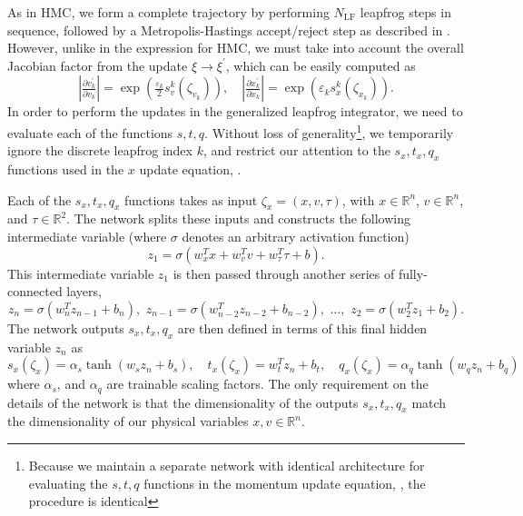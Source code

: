 \documentclass{article} %
\begin{document}
As in HMC, we form a complete trajectory by performing \(N_{\mathrm{LF}}\) leapfrog steps in sequence, followed by a
Metropolis-Hastings accept/reject step as described in .
%
However, unlike in the expression for HMC, we must take into account the overall Jacobian factor from the update
\(\xi\rightarrow\xi^{\prime}\), which can be easily computed as 
%
\begin{equation}
   \left|\tfrac{\partial v^{\prime}_{k}}{\partial v_{k}}\right| 
   = \exp{\left(\tfrac{\varepsilon_{k}}{2}s^{k}_{v}(\zeta_{v_{k}})\right)},\quad
   \left|\tfrac{\partial x^{\prime}_{k}}{\partial x_{k}}\right| 
   = \exp{\left(\varepsilon_{k} s^{k}_{x}(\zeta_{x_{k}})\right)}.
\end{equation}
%
In order to perform the updates in the generalized leapfrog integrator, we need to evaluate each of the functions
\(s, t, q\).
%
%
Without loss of generality\footnote{Because we maintain a separate network with identical architecture for evaluating
the \(s, t, q\) functions in the momentum update equation, , the procedure is identical},
we temporarily ignore the discrete leapfrog index \(k\), and restrict our attention to the
\(s_{x}, t_{x}, q_{x}\) functions used in the \(x\) update equation, .
%

Each of the \(s_{x}, t_{x}, q_{x}\) functions takes as input \(\zeta_{x} = (x, v, \tau)\), with \(x\in\mathbb{R}^{n}\),
\(v\in\mathbb{R}^{n}\), and \(\tau \in \mathbb{R}^{2}\).
%
The network splits these inputs and constructs the following intermediate variable (where \(\sigma\) denotes an
arbitrary activation function)
%
\begin{equation}
   z_{1} = \sigma(w_{x}^{T}x + w_{v}^{T}v + w_{\tau}^{T}\tau + b).
\end{equation}
%
This intermediate variable \(z_{1}\) is then passed through another series of fully-connected layers,
%
\begin{equation}
   z_{n} = \sigma(w_{n}^{T} z_{n-1} + b_{n}),\,\, z_{n-1}=\sigma(w_{n-2}^{T}z_{n-2} + b_{n-2}),\,\,%
   \ldots,\,\, z_{2} = \sigma(w_{2}^{T} z_{1} + b_{2}).
\end{equation}
%
The network outputs \(s_{x}, t_{x}, q_{x}\) are then defined in terms of this final hidden variable \(z_{n}\) as
%
\begin{equation}
   s_{x}(\zeta_{x}) = \alpha_{s}\tanh(w_{s}z_{n} + b_{s}),\quad
   t_{x}(\zeta_{x}) = w_{t}^{T}z_{n} + b_{t},\quad
   q_{x}(\zeta_{x}) = \alpha_{q}\tanh(w_{q}z_{n} + b_{q})
\end{equation}
%
where \(\alpha_{s}\), and \(\alpha_{q}\) are trainable scaling factors.
%
The only requirement on the details of the network is that the dimensionality of the outputs \(s_{x}, t_{x}, q_{x}\)
match the dimensionality of our physical variables \(x, v \in\mathbb{R}^{n}\).
%
\end{document}
